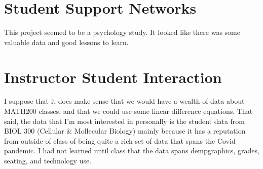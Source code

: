 \documentclass[12pt]{amsart}
\theoremstyle{definition}
\begin{document}
\begin{onehalfspace}
        \section{Student Support Networks}
        This project seemed to be a psychology study.
        It looked like there was some valuable data and good lessons to learn.

        \section{Instructor Student Interaction}
        I suppose that it does make sense that we would have a wealth of data about MATH200 classes, and that we
        could use some linear difference equations.
        That said, the data that I'm most interested in personally is the student data from BIOL 300
        (Cellular \& Mollecular Biology) mainly because it has a reputation from outside of class of being quite a
        rich set of data that spans the Covid pandemic.
        I had not learned until class that the data spans dempgraphics, grades, seating, and technology use.



    \end{onehalfspace}
\end{document}
